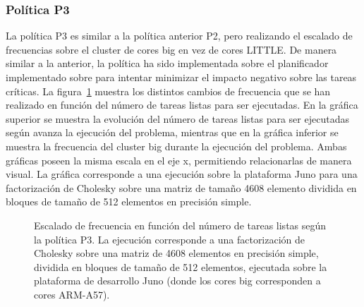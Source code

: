 \subsubsection{Política P3}
La política P3 es similar a la política anterior P2, pero realizando el
escalado de frecuencias sobre el cluster de cores big en vez de cores
LITTLE. De manera similar a la anterior, la política ha sido implementada
sobre el planificador \botlev implementado sobre \ompss para intentar
minimizar el impacto negativo sobre las tareas críticas. La
figura~\ref{s5:fig:P3-evo} muestra los distintos cambios de frecuencia que
se han realizado en función del número de tareas listas para ser
ejecutadas. En la gráfica superior se muestra la evolución del número de
tareas listas para ser ejecutadas según avanza la ejecución del problema,
mientras que en la gráfica inferior se muestra la frecuencia del cluster
big durante la ejecución del problema. Ambas gráficas poseen la misma
escala en el eje x, permitiendo relacionarlas de manera visual. La gráfica
corresponde a una ejecución sobre la plataforma Juno para una factorización
de Cholesky sobre una matriz de tamaño 4608 elemento dividida en bloques
de tamaño de 512 elementos en precisión simple.\\


\begin{figure}
  \centering
  {
    \setlength{\fboxsep}{-10pt}
  }
  \caption[Escalado de frecuencia en función del número de tareas listas
  según la política P3]{Escalado de frecuencia en función del número de
    tareas listas según la política P3. La ejecución corresponde a una
    factorización de Cholesky sobre una matriz de 4608 elementos en
    precisión simple, dividida en bloques de tamaño de 512 elementos,
    ejecutada sobre la plataforma de desarrollo Juno (donde los cores big
    corresponden a cores ARM-A57).}
  \label{s5:fig:P3-evo}
\end{figure}


